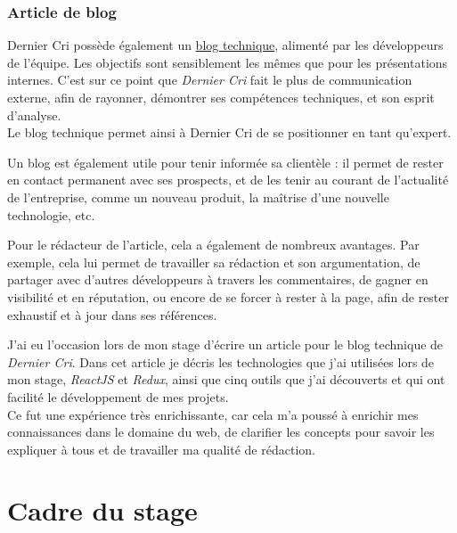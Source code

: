\bigskip

\subsubsection{Article de blog}\label{article-de-blog}

\bigskip

Dernier Cri possède également un
\href{http://derniercri.io/tech-blog}{blog technique}, alimenté par les
développeurs de l'équipe. Les objectifs sont sensiblement les mêmes que
pour les présentations internes. C'est sur ce point que \emph{Dernier
Cri} fait le plus de communication externe, afin de rayonner, démontrer
ses compétences techniques, et son esprit d'analyse.\\
Le blog technique permet ainsi à Dernier Cri de se positionner en tant
qu'expert.

\bigskip

Un blog est également utile pour tenir informée sa clientèle : il permet
de rester en contact permanent avec ses prospects, et de les tenir au
courant de l'actualité de l'entreprise, comme un nouveau produit, la
maîtrise d'une nouvelle technologie, etc.

\bigskip

Pour le rédacteur de l'article, cela a également de nombreux avantages.
Par exemple, cela lui permet de travailler sa rédaction et son
argumentation, de partager avec d'autres développeurs à travers les
commentaires, de gagner en visibilité et en réputation, ou encore de se
forcer à rester à la page, afin de rester exhaustif et à jour dans ses
références.

\bigskip

J'ai eu l'occasion lors de mon stage d'écrire un article pour le blog
technique de \emph{Dernier Cri}. Dans cet article je décris les
technologies que j'ai utilisées lors de mon stage, \emph{ReactJS} et
\emph{Redux}, ainsi que cinq outils que j'ai découverts et qui ont
facilité le développement de mes projets.\\
Ce fut une expérience très enrichissante, car cela m'a poussé à enrichir
mes connaissances dans le domaine du web, de clarifier les concepts pour
savoir les expliquer à tous et de travailler ma qualité de rédaction.

\newpage

\section{Cadre du stage}\label{cadre-du-stage}

